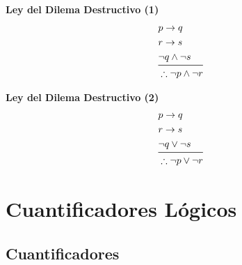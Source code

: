 \documentclass[12pt]{report}                                    %
\begin{document}
        \begin{multicols}{2}
            
            \large{\textbf{Ley del Dilema Destructivo (1)}}
                \begin{equation*}
                \begin{split}
                    &p \to q                \\
                    &r \to s                \\
                    &\lnot q \land \lnot s  \\
                    \midrule
                    &\therefore \lnot p \land \lnot r
                \end{split}
                \end{equation*}

            \large{\textbf{Ley del Dilema Destructivo (2)}}
                \begin{equation*}
                \begin{split}
                    &p \to q                \\
                    &r \to s                \\
                    &\lnot q \lor \lnot s   \\
                    \midrule
                    &\therefore \lnot p \lor \lnot r
                \end{split}
                \end{equation*}

        \end{multicols}




\clearpage
\chapter{Cuantificadores Lógicos}
    \clearpage

    \clearpage
    \section{Cuantificadores}
\end{document}
